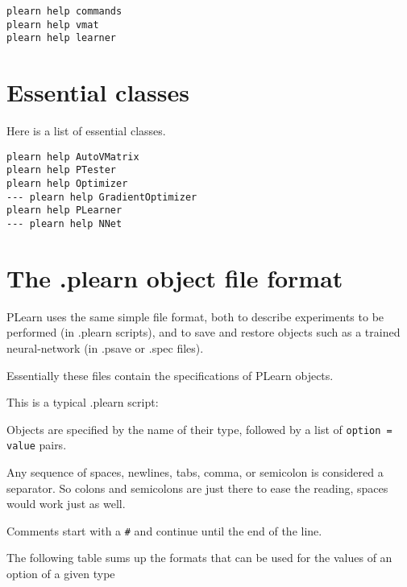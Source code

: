 \documentclass[11pt]{book}
\begin{document}
\begin{verbatim}
plearn help commands
plearn help vmat
plearn help learner
\end{verbatim}

\section{Essential classes}

Here is a list of essential classes.

\begin{verbatim}
plearn help AutoVMatrix
plearn help PTester
plearn help Optimizer
--- plearn help GradientOptimizer
plearn help PLearner
--- plearn help NNet
\end{verbatim}

\section{The .plearn object file format}

PLearn uses the same simple file format, both to describe experiments to be
performed (in .plearn scripts), and to save and restore objects
such as a trained neural-network (in .psave or .spec files).

Essentially these files contain the specifications of PLearn objects.

This is a typical .plearn script:



Objects are specified by the name of their type, followed by a list of
\verb!option = value! pairs. 

Any sequence of spaces, newlines, tabs, comma, or semicolon is considered a
separator. So colons and semicolons are just there to ease the reading,
spaces would work just as well.

Comments start with a \verb!#! and continue until the end of the line.

The following table sums up the formats that can be used for the values of
an option of a given type
\end{document}
